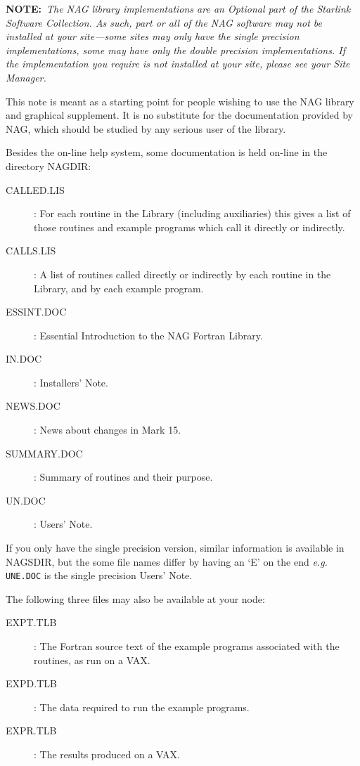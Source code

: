 {\bf NOTE:}~{\em The NAG library implementations are an Optional part of the
Starlink Software Collection. As such, part or all of the NAG software may not
be installed at your site---some sites may only have the single precision
implementations, some may have only the double precision implementations. If
the implementation you require is not installed at your site, please see your
Site Manager.}

This note is meant as a starting point for people wishing to use the NAG
library and graphical supplement. It is no substitute for the documentation
provided by NAG, which should be studied by any serious user of the library.

Besides the on-line help system, some documentation is held on-line in the
directory NAGDIR:

\begin{description}

\item [CALLED.LIS] : For each routine in the Library (including auxiliaries)
this gives a list of those routines and example programs which call it directly
or indirectly.

\item [CALLS.LIS] : A list of routines called directly or indirectly by each
routine in the Library, and by each example program.

\item [ESSINT.DOC] : Essential Introduction to the NAG Fortran Library.

\item [IN.DOC] : Installers' Note.

\item [NEWS.DOC] : News about changes in Mark 15.

\item [SUMMARY.DOC] : Summary of routines and their purpose.

\item [UN.DOC] : Users' Note.

\end{description}

If you only have the single precision version, similar information is
available in NAGSDIR, but the some file names differ by having an `E' on the
end {\it e.g.} {\tt UNE.DOC} is the single precision Users' Note.

The following three files may also be available at your node:

\begin{description}

\item [EXPT.TLB] : The Fortran source text of the example programs associated
with the routines, as run on a VAX.

\item [EXPD.TLB] : The data required to run the example programs.

\item [EXPR.TLB] : The results produced on a VAX.

\end{description}

